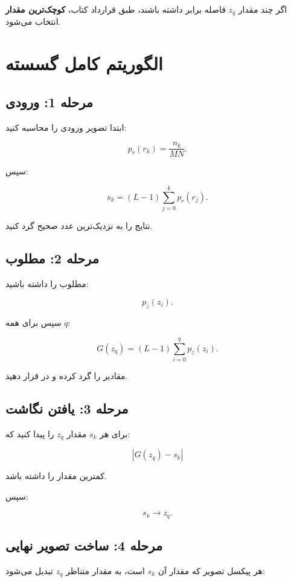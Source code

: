 \documentclass[12pt,a4paper]{article}
\begin{document}
	اگر چند مقدار $z_q$ فاصله برابر داشته باشند، طبق قرارداد کتاب،
	\textbf{کوچک‌ترین مقدار} انتخاب می‌شود.
	
	
	\section{الگوریتم کامل  گسسته}
	
	\subsection*{مرحله 1:  ورودی}
	
	ابتدا  تصویر ورودی را محاسبه کنید:
	
	\[
	p_r(r_k)=\frac{n_k}{MN}.
	\]
	
	سپس:
	
	\[
	s_k
	=
	(L-1)
	\sum_{j=0}^{k}p_r(r_j).
	\]
	
	نتایج را به نزدیک‌ترین عدد صحیح گرد کنید.
	
	\subsection*{مرحله 2:  مطلوب}
	
	 مطلوب را داشته باشید:
	
	\[
	p_z(z_i).
	\]
	
	سپس برای همه $q$:
	
	\[
	G(z_q)
	=
	(L-1)
	\sum_{i=0}^{q}p_z(z_i).
	\]
	
	مقادیر را گرد کرده و در  قرار دهید.
	
	\subsection*{مرحله 3: یافتن نگاشت}
	
	برای هر $s_k$ مقدار $z_q$ را پیدا کنید که:
	
	\[
	|G(z_q)-s_k|
	\]
	
	کمترین مقدار را داشته باشد.
	
	سپس:
	
	\[
	s_k\rightarrow z_q.
	\]
	
	\subsection*{مرحله 4: ساخت تصویر نهایی}
	
	هر پیکسل تصویر  که مقدار آن $s_k$ است، به مقدار متناظر
	$z_q$ تبدیل می‌شود:
	
\end{document}
